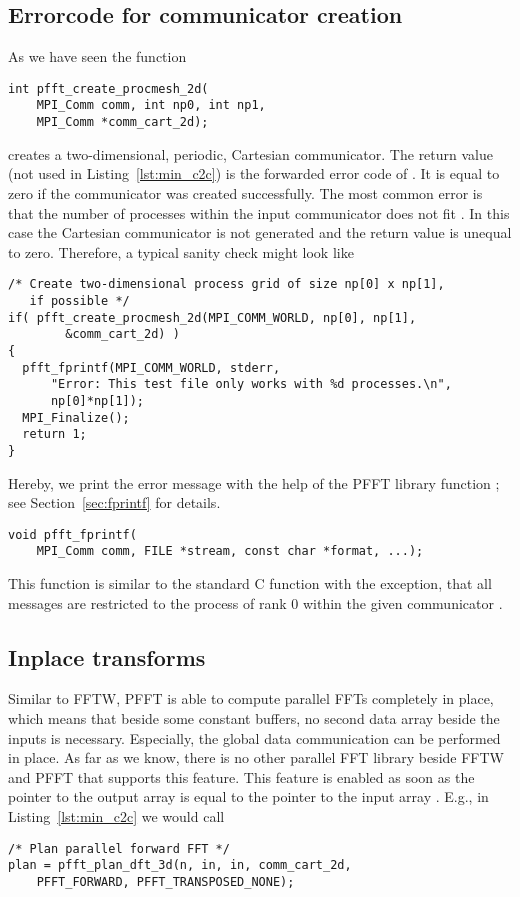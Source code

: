 \subsection{Errorcode for communicator creation}
As we have seen the function
\begin{lstlisting}
int pfft_create_procmesh_2d(
    MPI_Comm comm, int np0, int np1,
    MPI_Comm *comm_cart_2d);
\end{lstlisting}
creates a two-dimensional, periodic, Cartesian communicator. The  return value
(not used in Listing~\ref{lst:min_c2c}) is the forwarded error code of .
It is equal to zero if the communicator was created successfully.
The most common error is that the number of processes within the input
communicator  does not fit . In this case the Cartesian communicator
is not generated and the return value is unequal to zero. Therefore, a typical sanity check might look like
\begin{lstlisting}
/* Create two-dimensional process grid of size np[0] x np[1],
   if possible */
if( pfft_create_procmesh_2d(MPI_COMM_WORLD, np[0], np[1],
        &comm_cart_2d) )
{
  pfft_fprintf(MPI_COMM_WORLD, stderr,
      "Error: This test file only works with %d processes.\n",
      np[0]*np[1]);
  MPI_Finalize();
  return 1;
}
\end{lstlisting}
Hereby, we print the error message with the help of the PFFT library function ; see Section~\ref{sec:fprintf} for details.
\begin{lstlisting}
void pfft_fprintf(
    MPI_Comm comm, FILE *stream, const char *format, ...);
\end{lstlisting}
This function is similar to the standard C function  with the exception, that all messages are restricted
to the process of rank $0$ within the given communicator .

\subsection{Inplace transforms}
Similar to FFTW, PFFT is able to compute parallel FFTs completely in place, which means that beside some
constant buffers, no second data array beside the inputs is necessary. Especially, the global data communication
can be performed in place. As far as we know, there is no other parallel FFT library beside FFTW and PFFT that
supports this feature. 
This feature is enabled as soon as the pointer to the output array  is equal to the pointer to the input array .
E.g., in Listing~\ref{lst:min_c2c} we would call
\begin{lstlisting}[firstnumber=34]
/* Plan parallel forward FFT */
plan = pfft_plan_dft_3d(n, in, in, comm_cart_2d,
    PFFT_FORWARD, PFFT_TRANSPOSED_NONE);
\end{lstlisting}


